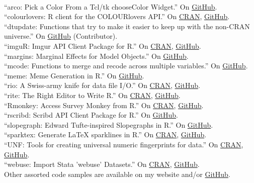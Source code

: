\documentclass[12pt]{article}
\renewcommand{\section}[1]{\pagebreak[3]%
    \llap{\scshape\smash{\parbox[t]{\marginparwidth}{\raggedright {\color{lg}#1}}}}%
    \vspace{-\baselineskip}\par}
\newcommand{\topic}[1]{\pagebreak[3]\indent {\color{lg}{\footnotesize #1 }}\\}
\newcommand{\entry}[1]{\indent {\color{lg}\guillemotright}\hspace{2pt}#1\vspace{.25em}\\}
\begin{document}
\section{Software}
\topic{R packages}
\entry{``arco: Pick a Color From a Tcl/tk chooseColor Widget.'' On \href{https://github.com/leeper/arco}{GitHub}.}
\entry{``colourlovers: R client for the COLOURlovers API.'' On \href{https://cran.r-project.org/package=colourlovers}{CRAN}, \href{https://github.com/leeper/colourloers}{GitHub}.}
\entry{``dtupdate: Functions that try to make it easier to keep up with the non-CRAN universe.'' On \href{https://github.com/hrbrmstr/dtupdate}{GitHub} (Contributor).}
\entry{``imguR: Imgur API Client Package for R.'' On \href{https://cran.r-project.org/package=imguR}{CRAN}, \href{https://github.com/leeper/imguR}{GitHub}.}
\entry{``margins: Marginal Effects for Model Objects.'' On \href{https://github.com/leeper/margins}{GitHub}.}
\entry{``mcode: Functions to merge and recode across multiple variables.'' On \href{https://github.com/leeper/mcode}{GitHub}.}
\entry{``meme: Meme Generation in R.'' On \href{https://github.com/leeper/meme}{GitHub}.}
\entry{``rio: A Swiss-army knife for data file I/O.'' On \href{https://cran.r-project.org/package=rio}{CRAN}, \href{https://github.com/leeper/rio}{GitHub}.}
\entry{``rite: The Right Editor to Write R.'' On \href{https://cran.r-project.org/package=rite}{CRAN}, \href{https://github.com/leeper/rio}{GitHub}.}
\entry{``Rmonkey: Access Survey Monkey from R.'' On \href{https://cran.r-project.org/package=Rmonkey}{CRAN}, \href{https://github.com/leeper/Rmonkey}{GitHub}.}
\entry{``rscribd: Scribd API Client Package for R.'' On \href{https://github.com/leeper/rscribd}{GitHub}.}
\entry{``slopegraph: Edward Tufte-inspired Slopegraphs in R.'' On \href{https://github.com/leeper/slopegraph}{GitHub}.}
\entry{``sparktex: Generate LaTeX sparklines in R.'' On \href{https://cran.r-project.org/package=sparktex}{CRAN}, \href{https://github.com/leeper/sparktex}{GitHub}.}
\entry{``UNF: Tools for creating universal numeric fingerprints for data.'' On \href{https://cran.r-project.org/package=UNF}{CRAN}, \href{https://github.com/leeper/UNF}{GitHub}.}
\entry{``webuse: Import Stata 'webuse' Datasets.'' On \href{https://cran.r-project.org/package=webuse}{CRAN}, \href{https://github.com/leeper/webuse}{GitHub}.}
\entry{Other assorted code samples are available on my website and/or \href{http://github.com/leeper}{GitHub}.}
\end{document}
